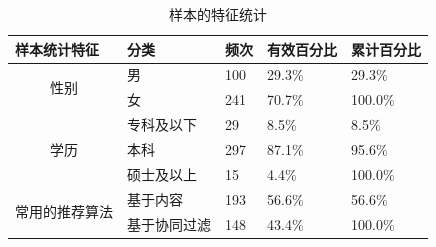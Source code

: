 \begin{table}[H]
\centering
\caption{样本的特征统计}
\label{tab:ybtj}
\begin{tabular}{@{}cllll@{}}
\toprule
\multicolumn{1}{l}{\textbf{样本统计特征}}          & \textbf{分类} & \textbf{频次} & \textbf{有效百分比} & \textbf{累计百分比} \\ \midrule
\multirow{2}{*}{性别}                          & 男           & 100         & 29.3\%         & 29.3\%         \\
                                             & 女           & 241         & 70.7\%         & 100.0\%        \\ \midrule
\multirow{3}{*}{学历}                          & 专科及以下       & 29          & 8.5\%          & 8.5\%          \\
                                             & 本科          & 297         & 87.1\%         & 95.6\%         \\
                                             & 硕士及以上       & 15          & 4.4\%          & 100.0\%        \\ \midrule
\multicolumn{1}{l}{\multirow{2}{*}{常用的推荐算法}} & 基于内容        & 193         & 56.6\%         & 56.6\%         \\
\multicolumn{1}{l}{}                         & 基于协同过滤      & 148         & 43.4\%         & 100.0\%        \\ \bottomrule
\end{tabular}
\end{table}



